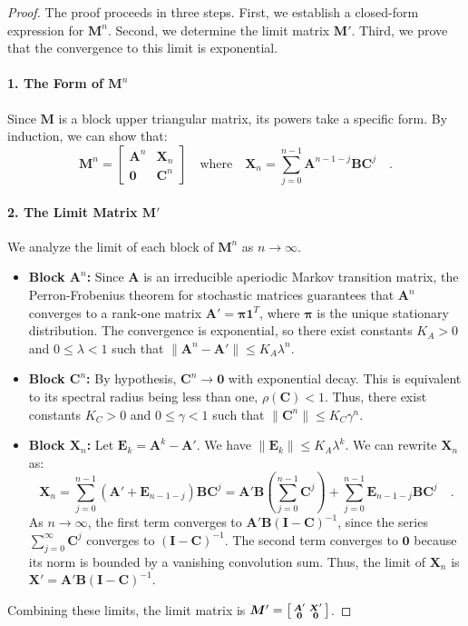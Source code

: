 \documentclass[../../main.tex]{subfiles}
\begin{document}
\begin{proof}
The proof proceeds in three steps. First, we establish a closed-form expression for $\bm{M}^n$. Second, we determine the limit matrix $\bm{M}'$. Third, we prove that the convergence to this limit is exponential.

\paragraph{1. The Form of \(\bm{M}^n\)}
Since $\bm{M}$ is a block upper triangular matrix, its powers take a specific form. By induction, we can show that:
\[
    \bm{M}^n = 
    \begin{bmatrix}
        \bm{A}^n & \bm{X}_n \\
        \bm{0} & \bm{C}^n
    \end{bmatrix}
    \quad \text{where} \quad
    \bm{X}_n = \sum_{j=0}^{n-1} \bm{A}^{n-1-j} \bm{B} \bm{C}^j
    \quad .
\]

\paragraph{2. The Limit Matrix \(\bm{M}'\)}
We analyze the limit of each block of $\bm{M}^n$ as $n \to \infty$.

\begin{itemize}
    \item \textbf{Block \(\bm{A}^n\):} Since $\bm{A}$ is an irreducible aperiodic Markov transition matrix, the Perron-Frobenius theorem for stochastic matrices guarantees that $\bm{A}^n$ converges to a rank-one matrix $\bm{A}' = \bm{\pi}\bm{1}^T$, where $\bm{\pi}$ is the unique stationary distribution. The convergence is exponential, so there exist constants $K_A > 0$ and $0 \le \lambda < 1$ such that $\|\bm{A}^n - \bm{A}'\| \le K_A \lambda^n$.

    \item \textbf{Block \(\bm{C}^n\):} By hypothesis, $\bm{C}^n \to \bm{0}$ with exponential decay. This is equivalent to its spectral radius being less than one, $\rho(\bm{C}) < 1$. Thus, there exist constants $K_C > 0$ and $0 \le \gamma < 1$ such that $\|\bm{C}^n\| \le K_C \gamma^n$.

    \item \textbf{Block \(\bm{X}_n\):} Let $\bm{E}_k = \bm{A}^k - \bm{A}'$. We have $\|\bm{E}_k\| \le K_A\lambda^k$. We can rewrite $\bm{X}_n$ as:
    \[
        \bm{X}_n = \sum_{j=0}^{n-1} (\bm{A}' + \bm{E}_{n-1-j}) \bm{B} \bm{C}^j = \bm{A}'\bm{B} \left( \sum_{j=0}^{n-1} \bm{C}^j \right) + \sum_{j=0}^{n-1} \bm{E}_{n-1-j} \bm{B} \bm{C}^j \quad .
    \]
    As $n \to \infty$, the first term converges to $\bm{A}'\bm{B}(\bm{I}-\bm{C})^{-1}$, since the series $\sum_{j=0}^\infty \bm{C}^j$ converges to $(\bm{I}-\bm{C})^{-1}$. The second term converges to $\bm{0}$ because its norm is bounded by a vanishing convolution sum. Thus, the limit of $\bm{X}_n$ is $\bm{X}' = \bm{A}'\bm{B}(\bm{I}-\bm{C})^{-1}$.
\end{itemize}
Combining these limits, the limit matrix is $\bm{M}' = \begin{bsmallmatrix} \bm{A}' & \bm{X}' \\ \bm{0} & \bm{0} \end{bsmallmatrix}$.


\end{proof}
\end{document}
